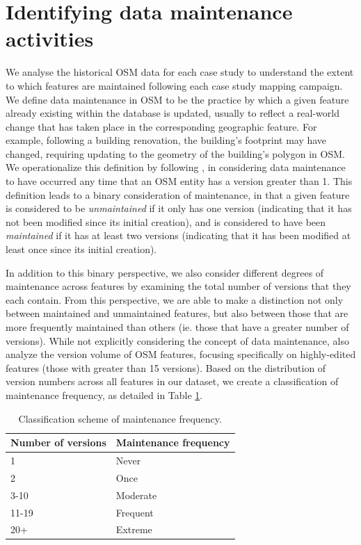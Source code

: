 \section{Identifying data maintenance activities}
\label{sec-maint}

We analyse the historical OSM data for each case study to understand the extent to which features are maintained following each case study mapping campaign. We define data maintenance in OSM to be the practice by which a given feature already existing within the database is updated, usually to reflect a real-world change that has taken place in the corresponding geographic feature.  For example, following a building renovation, the building's footprint may have changed, requiring updating to the geometry of the building's polygon in OSM. 
We operationalize this definition by following \textcite{quattrone_work_2017}, in considering data maintenance to have occurred any time that an OSM entity has a version greater than 1. This definition leads to a binary consideration of maintenance, in that a given feature is considered to be \textit{unmaintained} if it only has one version (indicating that it has not been modified since its initial creation), and is considered to have been \textit{maintained} if it has at least two versions (indicating that it has been modified at least once since its initial creation).  

In addition to this binary perspective, we also consider different degrees of maintenance across features by examining the total number of versions that they each contain. From this perspective, we are able to make a distinction not only between maintained and unmaintained features, but also between those that are more frequently maintained than others (ie. those that have a greater number of versions). While not explicitly considering the concept of data maintenance, \textcite{mooney_characteristics_2012} also analyze the version volume of OSM features, focusing specifically on highly-edited features (those with greater than 15 versions). Based on the distribution of version numbers across all features in our dataset, we create a classification of maintenance frequency, as detailed in Table \ref{tab:freq}. 

\begin{table}[]
\centering
\caption{Classification scheme of maintenance frequency.}
\label{tab:freq}
\begin{tabular}{ll}
\toprule
Number of versions & Maintenance frequency \\
\midrule
1                  & Never                  \\
2                  & Once                  \\
3-10               & Moderate              \\
11-19              & Frequent              \\
20+                & Extreme               \\
\bottomrule
\end{tabular}
\end{table}

